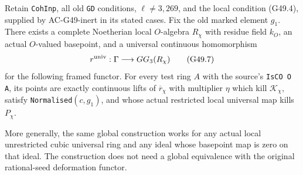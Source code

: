 \begin{theorem}
\label{AC-G49}
Retain \texttt{CohInp}, all old \texttt{GD} conditions,
$\ell\ne3,269$, and the local condition (G49.4), supplied by
AC-G49-inert in its stated cases.  Fix the old marked element
$g_1$.  There exists a complete Noetherian local $O$-algebra
$R_\chi$ with residue field $k_O$, an actual $O$-valued
basepoint, and a universal continuous homomorphism
\[
                       r^{\rm univ}:\Gamma\longrightarrow GG_3(R_\chi)
                                                                  \tag{G49.7}
\]
for the following framed functor.  For every test ring $A$
with the source's \texttt{IsCO O A}, its points are exactly
continuous lifts of $\overline r_\chi$ with multiplier $\eta$
which kill $\mathcal K_\chi$, satisfy
\texttt{Normalised}$(c,g_1)$, and whose actual restricted
local universal map kills $P_\chi$.

More generally, the same global construction works for any
actual local unrestricted cubic universal ring and any
ideal whose basepoint map is zero on that ideal.
The construction does not need a global equivalence with
the original rational-seed deformation functor.
\end{theorem}
